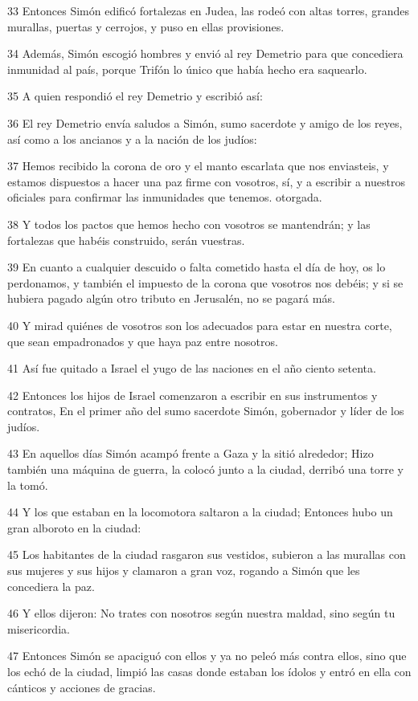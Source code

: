 \par 33 Entonces Simón edificó fortalezas en Judea, las rodeó con altas torres, grandes murallas, puertas y cerrojos, y puso en ellas provisiones.
\par 34 Además, Simón escogió hombres y envió al rey Demetrio para que concediera inmunidad al país, porque Trifón lo único que había hecho era saquearlo.
\par 35 A quien respondió el rey Demetrio y escribió así:
\par 36 El rey Demetrio envía saludos a Simón, sumo sacerdote y amigo de los reyes, así como a los ancianos y a la nación de los judíos:
\par 37 Hemos recibido la corona de oro y el manto escarlata que nos enviasteis, y estamos dispuestos a hacer una paz firme con vosotros, sí, y a escribir a nuestros oficiales para confirmar las inmunidades que tenemos. otorgada.
\par 38 Y todos los pactos que hemos hecho con vosotros se mantendrán; y las fortalezas que habéis construido, serán vuestras.
\par 39 En cuanto a cualquier descuido o falta cometido hasta el día de hoy, os lo perdonamos, y también el impuesto de la corona que vosotros nos debéis; y si se hubiera pagado algún otro tributo en Jerusalén, no se pagará más.
\par 40 Y mirad quiénes de vosotros son los adecuados para estar en nuestra corte, que sean empadronados y que haya paz entre nosotros.
\par 41 Así fue quitado a Israel el yugo de las naciones en el año ciento setenta.
\par 42 Entonces los hijos de Israel comenzaron a escribir en sus instrumentos y contratos, En el primer año del sumo sacerdote Simón, gobernador y líder de los judíos.
\par 43 En aquellos días Simón acampó frente a Gaza y la sitió alrededor; Hizo también una máquina de guerra, la colocó junto a la ciudad, derribó una torre y la tomó.
\par 44 Y los que estaban en la locomotora saltaron a la ciudad; Entonces hubo un gran alboroto en la ciudad:
\par 45 Los habitantes de la ciudad rasgaron sus vestidos, subieron a las murallas con sus mujeres y sus hijos y clamaron a gran voz, rogando a Simón que les concediera la paz.
\par 46 Y ellos dijeron: No trates con nosotros según nuestra maldad, sino según tu misericordia.
\par 47 Entonces Simón se apaciguó con ellos y ya no peleó más contra ellos, sino que los echó de la ciudad, limpió las casas donde estaban los ídolos y entró en ella con cánticos y acciones de gracias.
